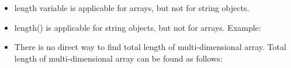 \begin{flushleft}
\begin{itemize}
		\item length variable is applicable for arrays, but not for string objects.
		\item length() is applicable for string objects, but not for arrays.
		Example:
		\bigskip	
		\bigskip
		\item There is no direct way to find total length of multi-dimensional array. Total length of multi-dimensional array can be found as follows:
	\end{itemize}
\end{flushleft}
